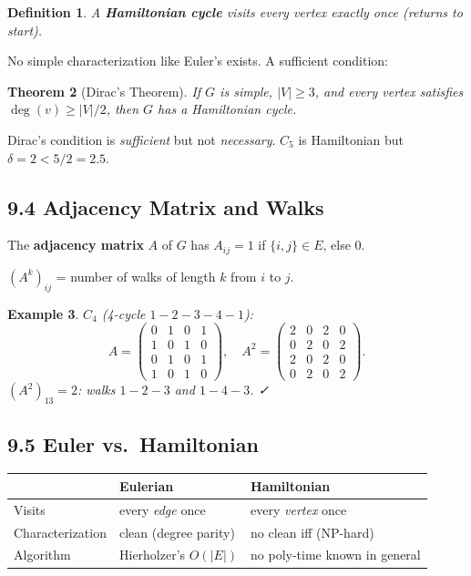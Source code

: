 \documentclass[11pt]{article}
\newtheorem{definition}{Definition}[section]
\newtheorem{example}[definition]{Example}
\newtheorem{theorem}[definition]{Theorem}
\begin{document}
\begin{definition}
A \textbf{Hamiltonian cycle} visits every vertex exactly once (returns to start).
\end{definition}

No simple characterization like Euler's exists. A sufficient condition:

\begin{theorem}[Dirac's Theorem]
If $G$ is simple, $|V|\ge3$, and every vertex satisfies $\deg(v)\ge|V|/2$, then $G$ has a Hamiltonian cycle.
\end{theorem}

\begin{tcolorbox}[notebox]
Dirac's condition is \emph{sufficient} but not \emph{necessary}. $C_5$ is Hamiltonian but $\delta=2<5/2=2.5$.
\end{tcolorbox}

\subsection*{9.4 Adjacency Matrix and Walks}

The \textbf{adjacency matrix} $A$ of $G$ has $A_{ij}=1$ if $\{i,j\}\in E$, else $0$.

\begin{tcolorbox}[keybox={Powers of adjacency matrix}]
$(A^k)_{ij}$ = number of walks of length $k$ from $i$ to $j$.
\end{tcolorbox}

\begin{example}
$C_4$ (4-cycle $1{-}2{-}3{-}4{-}1$):
\[A=\begin{pmatrix}0&1&0&1\\1&0&1&0\\0&1&0&1\\1&0&1&0\end{pmatrix},\quad A^2=\begin{pmatrix}2&0&2&0\\0&2&0&2\\2&0&2&0\\0&2&0&2\end{pmatrix}.\]
$(A^2)_{13}=2$: walks $1{-}2{-}3$ and $1{-}4{-}3$. ✓
\end{example}

\subsection*{9.5 Euler vs.\ Hamiltonian}

\begin{center}
\begin{tabular}{lll}
\toprule
 & \textbf{Eulerian} & \textbf{Hamiltonian}\\
\midrule
Visits & every \emph{edge} once & every \emph{vertex} once\\
Characterization & clean (degree parity) & no clean iff (NP-hard)\\
Algorithm & Hierholzer's $O(|E|)$ & no poly-time known in general\\
\bottomrule
\end{tabular}
\end{center}
\end{document}
